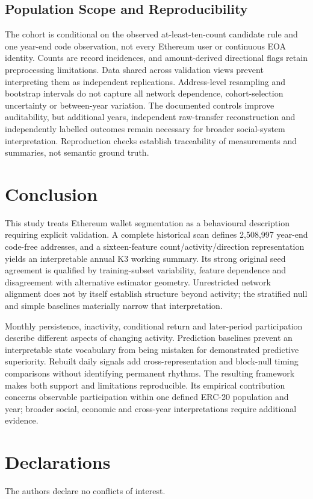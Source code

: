 \documentclass[journal,letterpaper]{IEEEtran}
\begin{document}
\subsection{Population Scope and Reproducibility}
The cohort is conditional on the observed at-least-ten-count candidate rule and one year-end code observation, not every Ethereum user or continuous EOA identity. Counts are record incidences, and amount-derived directional flags retain preprocessing limitations. Data shared across validation views prevent interpreting them as independent replications. Address-level resampling and bootstrap intervals do not capture all network dependence, cohort-selection uncertainty or between-year variation. The documented controls improve auditability, but additional years, independent raw-transfer reconstruction and independently labelled outcomes remain necessary for broader social-system interpretation. Reproduction checks establish traceability of measurements and summaries, not semantic ground truth.

\section{Conclusion}
This study treats Ethereum wallet segmentation as a behavioural description requiring explicit validation. A complete historical scan defines 2,508,997 year-end code-free addresses, and a sixteen-feature count/activity/direction representation yields an interpretable annual K3 working summary. Its strong original seed agreement is qualified by training-subset variability, feature dependence and disagreement with alternative estimator geometry. Unrestricted network alignment does not by itself establish structure beyond activity; the stratified null and simple baselines materially narrow that interpretation.

Monthly persistence, inactivity, conditional return and later-period participation describe different aspects of changing activity. Prediction baselines prevent an interpretable state vocabulary from being mistaken for demonstrated predictive superiority. Rebuilt daily signals add cross-representation and block-null timing comparisons without identifying permanent rhythms. The resulting framework makes both support and limitations reproducible. Its empirical contribution concerns observable participation within one defined ERC-20 population and year; broader social, economic and cross-year interpretations require additional evidence.

\section*{Declarations}
The authors declare no conflicts of interest.
\end{document}
